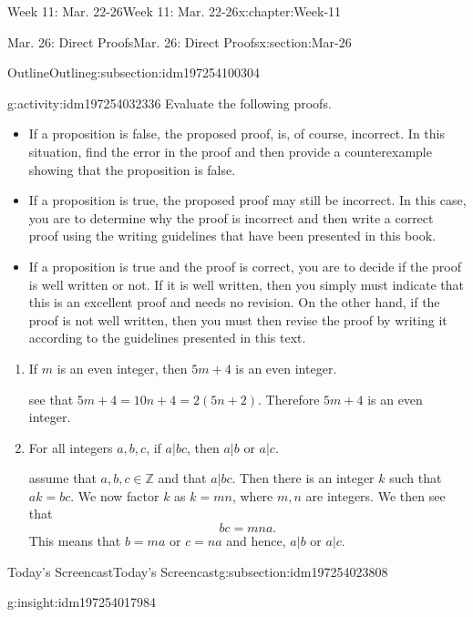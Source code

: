 \documentclass[oneside,10pt,]{book}
\numberwithin{equation}{section}
\def\Z{{\mathbb Z}}
\newcommand{\Z}{\mathbb Z}
\begin{document}
\begin{chapterptx}{Week 11: Mar. 22-26}{}{Week 11: Mar. 22-26}{}{}{x:chapter:Week-11}
\begin{sectionptx}{Mar. 26: Direct Proofs}{}{Mar. 26: Direct Proofs}{}{}{x:section:Mar-26}
\begin{subsectionptx}{Outline}{}{Outline}{}{}{g:subsection:idm197254100304}
\begin{activity}{}{g:activity:idm197254032336}
Evaluate the following proofs.%
\begin{itemize}[label=\textbullet]
\item{}If a proposition is false, the proposed proof, is, of course, incorrect. In this situation, find the error in the proof and then provide a counterexample showing that the proposition is false.%
\item{}If a proposition is true, the proposed proof may still be incorrect. In this case, you are to determine why the proof is incorrect and then write a correct proof using the writing guidelines that have been presented in this book.%
\item{}If a proposition is true and the proof is correct, you are to decide if the proof is well written or not. If it is well written, then you simply must indicate that this is an excellent proof and needs no revision. On the other hand, if the proof is not well written, then you must then revise the proof by writing it according to the guidelines presented in this text.%
\end{itemize}
%
%
\begin{enumerate}
\item{}If \(m\) is an even integer, then \(5m+4\) is an even integer.%
\par\smallskip%
\noindentWe see that \(5m+4 = 10n +4 = 2(5n+2)\). Therefore \(5m+4\) is an even integer.%
\item{}For all integers \(a,b,c\), if \(a|bc\), then \(a|b\) or \(a|c\).%
\par\smallskip%
\noindentWe assume that \(a,b,c\in\Z\) and that \(a|bc\). Then there is an integer \(k\) such that \(ak=bc\). We now factor \(k\) as \(k=mn\), where \(m,n\) are integers. We then see that%
\begin{equation*}
bc = mna.
\end{equation*}
This means that \(b=ma\) or \(c=na\) and hence, \(a|b\) or \(a|c\).%
\end{enumerate}
\end{activity}%
\end{subsectionptx}
%
%
\typeout{************************************************}
\typeout{************************************************}
%
\begin{subsectionptx}{Today's Screencast}{}{Today's Screencast}{}{}{g:subsection:idm197254023808}
\begin{insight}{}{g:insight:idm197254017984}%
\end{insight}
\end{subsectionptx}

\end{sectionptx}
\end{chapterptx}
\end{document}
